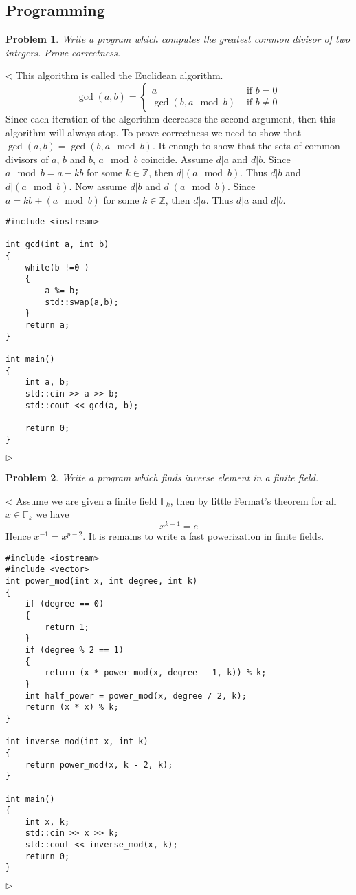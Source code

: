 \documentclass[12pt]{article}
\newtheorem{problem}{Problem}[subsection]
\newenvironment{solution}{\par $\triangleleft$}{$\triangleright$}
\begin{document}
 
 
 
 
 
 
 
 
 
 
\newpage
 
\subsection{Programming}
 
\begin{problem} Write a program which computes the greatest common divisor of two integers. Prove correctness.
\end{problem}
\begin{solution} This algorithm is called the Euclidean algorithm.
$$
\gcd(a,b)=\begin{cases}a &\mbox{ if } b=0\\\gcd(b, a\mod b)&\mbox{ if } b\neq 0\end{cases}
$$
Since each iteration of the algorithm decreases the second argument, then this algorithm will always stop. To prove correctness we need to show that $\gcd(a,b)=\gcd(b, a\mod b)$. It enough to show that the sets of common divisors of $a$, $b$ and $b$, $a\mod b$ coincide. Assume $d|a$ and $d|b$. Since $a\mod b=a-kb$ for some $k\in\mathbb{Z}$, then $d|(a\mod b)$. Thus $d|b$ and $d|(a\mod b)$. Now  assume $d|b$ and $d|(a\mod b)$. Since $a=kb+(a\mod b)$ for some $k\in\mathbb{Z}$, then $d|a$. Thus $d|a$ and $d|b$.
\begin{verbatim}
#include <iostream>
 
int gcd(int a, int b)
{
    while(b !=0 )
    {
        a %= b;
        std::swap(a,b);
    }
    return a;
}
 
int main()
{
    int a, b;
    std::cin >> a >> b;
    std::cout << gcd(a, b);
    
    return 0;
}
\end{verbatim}
\end{solution}
 
\begin{problem} Write a program which finds inverse element in a finite field.
\end{problem}
\begin{solution} Assume we are given a finite field $\mathbb{F}_k$, then by little Fermat’s theorem for all $x\in \mathbb{F}_k$ we have
$$
x^{k-1}=e
$$
Hence $x^{-1}=x^{p-2}$. It is remains to write a fast powerization in finite fields.
\begin{verbatim}
#include <iostream>
#include <vector>
int power_mod(int x, int degree, int k)
{
    if (degree == 0)
    {
        return 1;
    }
    if (degree % 2 == 1)
    {
        return (x * power_mod(x, degree - 1, k)) % k;
    }
    int half_power = power_mod(x, degree / 2, k);
    return (x * x) % k;
}
 
int inverse_mod(int x, int k)
{
    return power_mod(x, k - 2, k);
}
 
int main()
{
    int x, k;
    std::cin >> x >> k;
    std::cout << inverse_mod(x, k);
    return 0;
}
\end{verbatim}
\end{solution}
 
\end{document}
